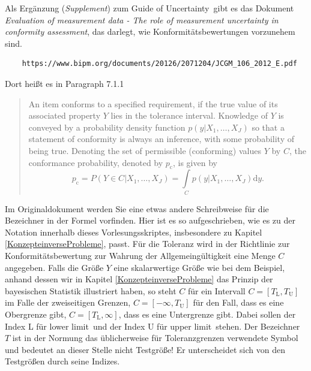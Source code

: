 Als Ergänzung (\textsl{Supplement}) zum \glqq Guide of Uncertainty\grqq ~gibt es das Dokument
\textsl{Evaluation of measurement data - The role of measurement uncertainty in conformity assessment},
das darlegt, wie Konformitätsbewertungen vorzunehem sind.
\begin{verbatim}
	https://www.bipm.org/documents/20126/2071204/JCGM_106_2012_E.pdf
\end{verbatim}
Dort heißt es in Paragraph 7.1.1
\begin{quote}
	An item conforms to a specified requirement,
	if the true value of its associated property $Y$ lies in the tolerance
	interval. Knowledge of $Y$ is conveyed by a probability density function $p(y|{X_1,\dots,X_J})$
	so that a statement of conformity is always an inference,
	with some probability of being true. Denoting the set of permissible (conforming) values
	$Y$ by $C$, the conformance probability, denoted by $p_\mathrm{c}$, is given by
	\begin{equation}
		p_\mathrm{c} = P(Y \in C | {X_1,\dots,X_J}) = \int\limits_C p(y|{X_1,\dots,X_J}) \mathrm{d}y.
	\end{equation}
\end{quote}
Im Originaldokument werden Sie eine etwas andere Schreibweise für die Bezeichner in der Formel vorfinden.
Hier ist es so aufgeschrieben, wie es zu der Notation innerhalb dieses Vorlesungsskriptes, insbesondere
zu Kapitel \ref{KonzepteinverseProbleme}, passt.
Für die Toleranz wird in der Richtlinie zur Konformitätsbewertung zur Wahrung der Allgemeingültigkeit
eine Menge $C$ angegeben. Falls die Größe $Y$ eine skalarwertige Größe wie bei dem Beispiel, anhand dessen
wir in Kapitel \ref{KonzepteinverseProbleme} das Prinzip der bayesischen Statistik illustriert haben,
so steht $C$ für ein Intervall $C = [T_\mathrm{L}, T_\mathrm{U}]$ im Falle der zweiseitigen
Grenzen, $C = [-\infty, T_\mathrm{U}]$ für den Fall, dass es eine Obergrenze gibt,
$C = [T_\mathrm{L}, \infty]$, dass es eine Untergrenze gibt. Dabei sollen der Index L für \glqq lower
limit\grqq ~und der Index U für \glqq upper limit\grqq ~stehen. Der Bezeichner $T$ ist in der
Normung das üblicherweise für Toleranzgrenzen verwendete Symbol und bedeutet an dieser
Stelle nicht Testgröße! Er unterscheidet sich von den Testgrößen durch seine Indizes.

